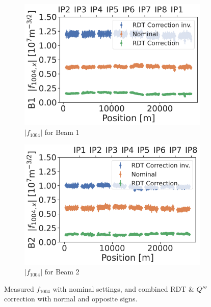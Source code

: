 \begin{figure}[!htb]
    \centering
    \begin{subfigure}{0.48\textwidth}
        \includegraphics[width=1\textwidth]{./images/f1004/f1004x_corrections_B1.pdf}
        \caption{$|f_{1004}|$ for Beam 1}
    \end{subfigure}
    \hfill
    \begin{subfigure}{0.48\textwidth}
        \includegraphics[width=1\textwidth]{./images/f1004/f1004x_corrections_B2.pdf}
        \caption{$|f_{1004}|$ for Beam 2}
    \end{subfigure}
    \caption{Measured $f_{1004}$ with nominal settings, and
    combined RDT \& $Q'''$ correction with normal and opposite signs.}
    \label{fig:decapoles:rdts:f1004_correction_B2}
\end{figure}



